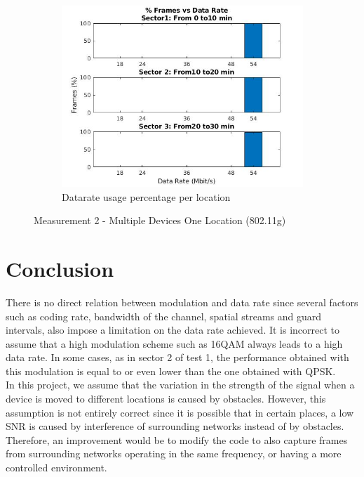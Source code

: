 \documentclass[12]{article}
\begin{document}
\begin{figure}[!htb]
\hspace*{-1.2cm}
\begin{subfigure}{.5\textwidth}
  \includegraphics[width=\linewidth]{"measurement 2/g_dev1fig3"}
  \caption{Datarate usage percentage per location}
  \label{fig:g_meas2_sub3}
\end{subfigure}
\caption{Measurement 2 - Multiple Devices One Location (802.11g)}
\label{fig:g_meas2}
\end{figure}


\newpage
\section{Conclusion}
There is no direct relation between modulation and data rate since several factors such as coding rate, bandwidth of the channel, spatial streams and guard intervals, also impose a limitation on the data rate achieved. It is incorrect to assume that a high modulation scheme such as 16QAM always leads to a high data rate. In some cases, as in sector 2 of test 1, the performance obtained with this modulation is equal to or even lower than the one obtained with QPSK.\\

In this project, we assume that the variation in the strength of the signal when a device is moved to different locations is caused by obstacles. However, this assumption is not entirely correct since it is possible that in certain places, a low SNR is caused by interference of surrounding networks instead of by obstacles. Therefore, an improvement would be to modify the code to also capture frames from surrounding networks operating in the same frequency, or having a more controlled environment.\\\\



\end{document}
